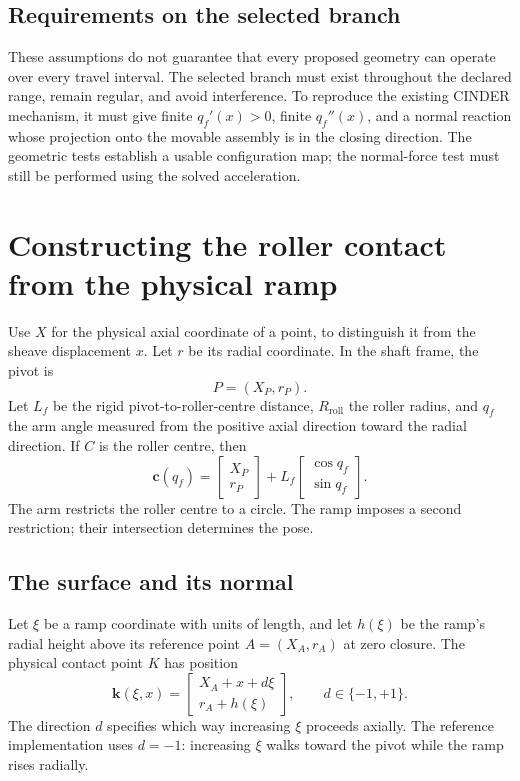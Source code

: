 \documentclass[11pt,letterpaper]{article}
\numberwithin{equation}{section}
\begin{document}
\subsection{Requirements on the selected branch}

These assumptions do not guarantee that every proposed geometry can operate over every travel interval. The selected branch must exist throughout the declared range, remain regular, and avoid interference. To reproduce the existing CINDER mechanism, it must give finite $q_f'(x)>0$, finite $q_f''(x)$, and a normal reaction whose projection onto the movable assembly is in the closing direction. The geometric tests establish a usable configuration map; the normal-force test must still be performed using the solved acceleration.

\section{Constructing the roller contact from the physical ramp}
\label{sec:geometry}

Use $X$ for the physical axial coordinate of a point, to distinguish it from the sheave displacement $x$. Let $r$ be its radial coordinate. In the shaft frame, the pivot is
\begin{equation}
  P=(X_P,r_P).
\end{equation}
Let $L_f$ be the rigid pivot-to-roller-centre distance, $R_{\mathrm{roll}}$ the roller radius, and $q_f$ the arm angle measured from the positive axial direction toward the radial direction. If $C$ is the roller centre, then
\begin{equation}
  \bm c(q_f)=
  \begin{bmatrix}X_P\\r_P\end{bmatrix}
  +L_f\begin{bmatrix}\cos q_f\\\sin q_f\end{bmatrix}.
  \label{eq:arm-circle}
\end{equation}
The arm restricts the roller centre to a circle. The ramp imposes a second restriction; their intersection determines the pose.

\subsection{The surface and its normal}

Let $\xi$ be a ramp coordinate with units of length, and let $h(\xi)$ be the ramp's radial height above its reference point $A=(X_A,r_A)$ at zero closure. The physical contact point $K$ has position
\begin{equation}
  \bm k(\xi,x)=
  \begin{bmatrix}X_A+x+d\xi\\r_A+h(\xi)\end{bmatrix},
  \qquad d\in\{-1,+1\}.
  \label{eq:surface}
\end{equation}
The direction $d$ specifies which way increasing $\xi$ proceeds axially. The reference implementation uses $d=-1$: increasing $\xi$ walks toward the pivot while the ramp rises radially.
\end{document}
